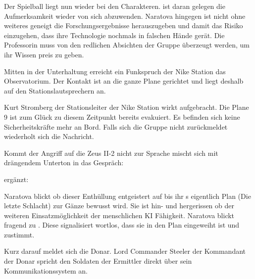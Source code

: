 Der Spielball liegt nun wieder bei den Charakteren. \xl{} ist daran gelegen die Aufmerksamkeit wieder von sich abzuwenden. Naratova hingegen ist nicht ohne weiteres geneigt die Forschungsergebnisse herauszugeben und damit das Risiko einzugehen, dass ihre Technologie nochmals in falschen Hände gerät. Die Professorin muss von den redlichen Absichten der Gruppe überzeugt werden, um ihr Wissen preis zu geben.

Mitten in der Unterhaltung erreicht ein Funkspruch der Nike Station das Observatorium. Der Kontakt ist an die ganze Plane gerichtet und liegt deshalb auf den Stationslautsprechern an.


Kurt Stromberg der Stationsleiter der Nike Station wirkt aufgebracht. Die Plane 9 ist zum Glück zu diesem Zeitpunkt bereits evakuiert. Es befinden sich keine Sicherheitskräfte mehr an Bord. Falls sich die Gruppe nicht zurückmeldet wiederholt sich die Nachricht. 

Kommt der Angriff auf die Zeus II-2 nicht zur Sprache mischt sich \xl{} mit drängendem Unterton in das Gespräch:


\ml{} ergänzt:


Naratova blickt ob dieser Enthüllung entgeistert auf bis ihr \xl{}s eigentlich Plan (Die letzte Schlacht) zur Gänze bewusst wird. Sie ist hin- und hergerissen ob der weiteren Einsatzmöglichkeit der menschlichen KI Fähigkeit. Naratova blickt fragend zu \ml{}. Diese signalisiert wortlos, dass sie in den Plan eingeweiht ist und zustimmt. 

Kurz darauf meldet sich die Donar. Lord Commander Steeler der Kommandant der Donar spricht den Soldaten der Ermittler direkt über sein Kommunikationssystem an.


